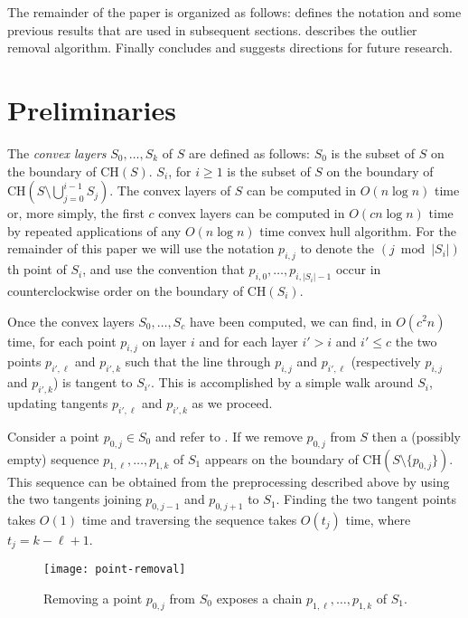 \documentclass[lotsofwhite]{patmorin}
\newcommand{\ch}{\mathrm{CH}}
\begin{document}
The remainder of the paper is organized as follows:
 defines the notation and some previous results
that are used in subsequent sections.  describes the
outlier removal algorithm. Finally  concludes and
suggests directions for future research.
 

\section{Preliminaries} 

The \emph{convex layers} $S_0,\ldots,S_k$ of $S$ are defined as
follows: $S_0$ is the subset of $S$ on the boundary of $\ch(S)$.
$S_i$, for $i\ge 1$ is the subset of $S$ on the boundary of
$\ch(S\setminus\bigcup_{j=0}^{i-1} S_j)$.  The convex layers of $S$
can be computed in $O(n\log n)$ time \cite{c85,hs92} or, more simply,
the first $c$ convex layers can be computed in $O(cn\log n)$ time by
repeated applications of any $O(n\log n)$ time convex hull algorithm.
For the remainder of this paper we will use the notation $p_{i,j}$ to
denote the $(j\bmod |S_i|)$th point of $S_i$, and use the convention
that $p_{i,0},\ldots,p_{i,|S_i|-1}$ occur in counterclockwise order on
the boundary of $\ch(S_i)$.

Once the convex layers $S_0,\ldots,S_c$ have been computed, we can
find, in $O(c^2 n)$ time, for each point $p_{i,j}$ on layer $i$ and
for each layer $i'> i$ and $i'\le c$ the two points $p_{i',\ell}$ and
$p_{i',k}$ such that the line through $p_{i,j}$ and $p_{i',\ell}$
(respectively $p_{i,j}$ and $p_{i',k}$) is tangent to $S_{i'}$.  This
is accomplished by a simple walk around $S_i$, updating tangents
$p_{i',\ell}$ and $p_{i',k}$ as we proceed.

Consider a point $p_{0,j}\in S_0$ and refer to .
If we remove $p_{0,j}$ from $S$ then a (possibly empty) sequence
$p_{1,\ell},\ldots,p_{1,k}$ of $S_1$ appears on the boundary of
$\ch(S\setminus\{p_{0,j}\})$.  This sequence can be obtained from the
preprocessing described above by using the two tangents joining
$p_{0,j-1}$ and $p_{0,j+1}$ to $S_1$.  Finding the two tangent points
takes $O(1)$ time and traversing the sequence takes $O(t_j)$ time,
where $t_j=k-\ell+1$.

\begin{figure}
\begin{center}\texttt{[image: point-removal]}\end{center}
\caption{Removing a point $p_{0,j}$ from $S_0$ exposes a chain
$p_{1,\ell},\ldots,p_{1,k}$ of $S_1$.}
\end{figure}
\end{document}
